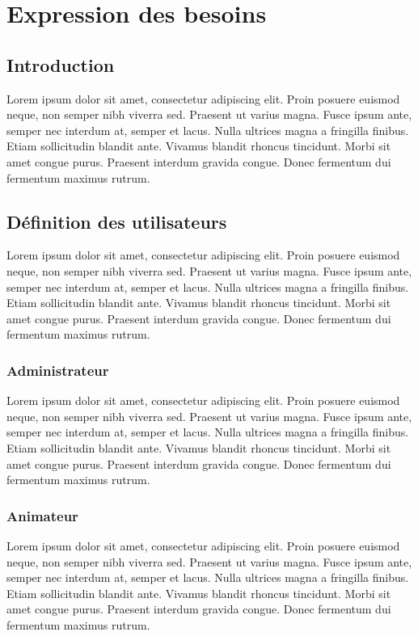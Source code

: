 \chapter{Expression des besoins}
\clearpage
\label{chap:besoins}

\section{Introduction}
Lorem ipsum dolor sit amet, consectetur adipiscing elit. Proin posuere euismod neque, non semper nibh viverra sed. Praesent ut varius magna. Fusce ipsum ante, semper nec interdum at, semper et lacus. Nulla ultrices magna a fringilla finibus. Etiam sollicitudin blandit ante. Vivamus blandit rhoncus tincidunt. Morbi sit amet congue purus. Praesent interdum gravida congue. Donec fermentum dui fermentum maximus rutrum.
\section{Définition des utilisateurs}
Lorem ipsum dolor sit amet, consectetur adipiscing elit. Proin posuere euismod neque, non semper nibh viverra sed. Praesent ut varius magna. Fusce ipsum ante, semper nec interdum at, semper et lacus. Nulla ultrices magna a fringilla finibus. Etiam sollicitudin blandit ante. Vivamus blandit rhoncus tincidunt. Morbi sit amet congue purus. Praesent interdum gravida congue. Donec fermentum dui fermentum maximus rutrum.
\subsection{Administrateur}
Lorem ipsum dolor sit amet, consectetur adipiscing elit. Proin posuere euismod neque, non semper nibh viverra sed. Praesent ut varius magna. Fusce ipsum ante, semper nec interdum at, semper et lacus. Nulla ultrices magna a fringilla finibus. Etiam sollicitudin blandit ante. Vivamus blandit rhoncus tincidunt. Morbi sit amet congue purus. Praesent interdum gravida congue. Donec fermentum dui fermentum maximus rutrum.


\subsection{Animateur}
Lorem ipsum dolor sit amet, consectetur adipiscing elit. Proin posuere euismod neque, non semper nibh viverra sed. Praesent ut varius magna. Fusce ipsum ante, semper nec interdum at, semper et lacus. Nulla ultrices magna a fringilla finibus. Etiam sollicitudin blandit ante. Vivamus blandit rhoncus tincidunt. Morbi sit amet congue purus. Praesent interdum gravida congue. Donec fermentum dui fermentum maximus rutrum.


